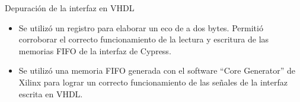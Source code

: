 \begin{frame}{Depuración de la interfaz en VHDL}
	\begin{itemize}
		\item Se utilizó un registro para elaborar un eco de a dos bytes. Permitió corroborar el correcto funcionamiento de la lectura y escritura de las memorias FIFO de la interfaz de Cypress.
		\item Se utilizó una memoria FIFO generada con el software ``Core Generator'' de Xilinx para lograr un correcto funcionamiento de las señales de la interfaz escrita en VHDL.
	\end{itemize}
\end{frame}
